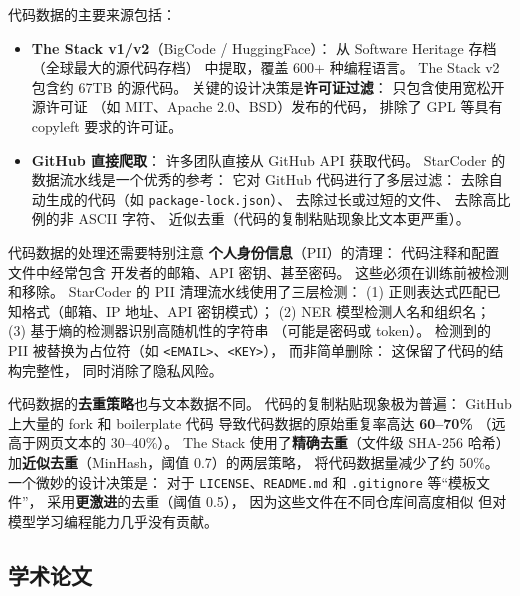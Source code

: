 代码数据的主要来源包括：

\begin{itemize}[noitemsep]
  \item \textbf{The Stack v1/v2}（BigCode / HuggingFace）：
        从 Software Heritage 存档（全球最大的源代码存档）
        中提取，覆盖 600+ 种编程语言。
        The Stack v2 包含约 67TB 的源代码。
        关键的设计决策是\textbf{许可证过滤}：
        只包含使用宽松开源许可证
        （如 MIT、Apache 2.0、BSD）发布的代码，
        排除了 GPL 等具有 copyleft 要求的许可证。
  \item \textbf{GitHub 直接爬取}：
        许多团队直接从 GitHub API 获取代码。
        StarCoder 的数据流水线是一个优秀的参考：
        它对 GitHub 代码进行了多层过滤：
        去除自动生成的代码（如 \texttt{package-lock.json}）、
        去除过长或过短的文件、
        去除高比例的非 ASCII 字符、
        近似去重（代码的复制粘贴现象比文本更严重）。
\end{itemize}

代码数据的处理还需要特别注意
\textbf{个人身份信息}（PII）的清理：
代码注释和配置文件中经常包含
开发者的邮箱、API 密钥、甚至密码。
这些必须在训练前被检测和移除。
StarCoder 的 PII 清理流水线使用了三层检测：
(1) 正则表达式匹配已知格式（邮箱、IP 地址、API 密钥模式）；
(2) NER 模型检测人名和组织名；
(3) 基于熵的检测器识别高随机性的字符串
（可能是密码或 token）。
检测到的 PII 被替换为占位符（如 \texttt{<EMAIL>}、\texttt{<KEY>}），
而非简单删除：
这保留了代码的结构完整性，
同时消除了隐私风险。

代码数据的\textbf{去重策略}也与文本数据不同。
代码的复制粘贴现象极为普遍：
GitHub 上大量的 fork 和 boilerplate 代码
导致代码数据的原始重复率高达 \textbf{60--70\%}
（远高于网页文本的 30--40\%）。
The Stack 使用了\textbf{精确去重}（文件级 SHA-256 哈希）
加\textbf{近似去重}（MinHash，阈值 0.7）的两层策略，
将代码数据量减少了约 50\%。
一个微妙的设计决策是：
对于 \texttt{LICENSE}、\texttt{README.md}
和 \texttt{.gitignore} 等“模板文件”，
采用\textbf{更激进}的去重（阈值 0.5），
因为这些文件在不同仓库间高度相似
但对模型学习编程能力几乎没有贡献。

\subsection{学术论文}

